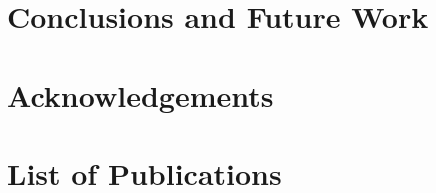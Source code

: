 \documentclass[11pt]{report}
\begin{document}
\chapter{Conclusions and Future Work}
\label{chap:conclusion}


\newpage




\newpage
\chapter*{Acknowledgements}


\newpage
\chapter*{List of Publications}

\end{document}
